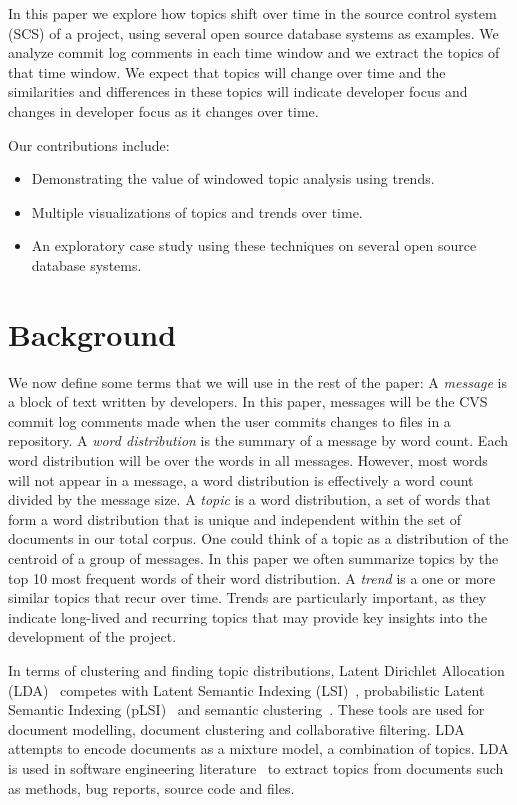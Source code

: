 \documentclass[times, 10pt,twocolumn]{article}
\newcommand{\shrinkit}{\vspace*{-.3em}}
\begin{document}
In this paper we explore how topics shift over time in the source
control system (SCS) of a project, using several open source database
systems as examples. We analyze commit log comments in each
time window and we extract the topics of that time window. We expect
that topics will change over time and the similarities and differences
in these topics will indicate developer focus and changes in developer
focus as it changes over time.

Our contributions include:
\begin{itemize}
\item Demonstrating the value of windowed topic analysis using trends.
\item Multiple visualizations of topics and trends over time.
\item An exploratory case study using these techniques on several open source database systems.
\end{itemize}

\shrinkit
\section{Background}
\shrinkit


We now define some terms that we will use in the rest of the paper: A
\emph{message} is a block of text written by developers. In this
paper, messages will be the CVS commit log comments made when the user
commits changes to files in a repository. A \emph{word distribution}
is the summary of a message by word count. Each word distribution will
be over the words in all messages. However, most words will not appear
in a message, a word distribution is effectively a word count divided
by the message size. A \emph{topic} is a word distribution, a
set of words that form a word distribution that is unique and
independent within the set of documents in our total corpus. One could
think of a topic as a distribution of the centroid of a group of
messages. In this paper we often summarize topics by the top 10 most
frequent words of their word distribution.  A \emph{trend} is a one or
more similar topics that recur over time.  Trends are particularly
important, as they indicate long-lived and recurring topics that may
provide key insights into the development of the project.


In terms of clustering and finding topic distributions, Latent
Dirichlet Allocation (LDA)~\cite{944937} competes with Latent Semantic
Indexing
(LSI)~\cite{1374321,10.1109/ICPC.2007.13},
probabilistic Latent Semantic Indexing (pLSI)~\cite{944937} and
semantic clustering~\cite{1698774,1566153}. These tools are used for
document modelling, document clustering and collaborative
filtering. LDA attempts to encode documents as a mixture
model, a combination of topics.  LDA is used in software engineering
literature~\cite{lukins2008,10.1109/MSR.2007.20}%
 to extract topics from documents such as methods, bug
reports, source code and files.
\end{document}
